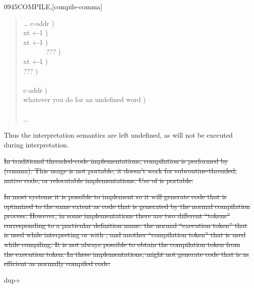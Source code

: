 \begin{worddef}{0945}{COMPILE,}[compile-comma]
\begin{rationale}
		\begin{quote}\ttfamily
		\ldots 										\tab[22]	 c-addr ) \\
		  			\tab[17.2]	 xt +-1 ) \\
		\tab {}  		\tab[17.4]	 xt +-1 ) \\
			\tab[2]   \ 
				 \ 
			 \ 
				 \ 
											\tab[0.2]	 ??? ) \\
		\tab {}							\tab[21]	 xt +-1 ) \\
			\tab[2]   		\tab[14.6]	 ??? ) \\
		\tab {} \\
			\word{ELSE} 							\tab[22]	 c-addr ) \\
		\tab \word{p} \textrm{whatever you do for an undefined word} ) \\
		\word{THEN} \\
		\ldots
		\end{quote}

		Thus the interpretation semantics are left undefined, as 
		will not be executed during interpretation.

\sout{%
		In traditional threaded-code implementations, compilation is
		performed by \word{,} (comma). This usage is not portable; it
		doesn't work for subroutine-threaded, native code, or
		relocatable implementations. Use of  is portable.
}

\sout{%
		In most systems it is possible to implement \word{COMPILE,} so
		it will generate code that is optimized to the same extent as
		code that is generated by the normal compilation process.
		However, in some implementations there are two different
		``tokens'' corresponding to a particular definition name:
		the normal ``execution token'' that is used while interpreting
		or with \word{EXECUTE}, and another ``compilation token'' that
		is used while compiling. It is not always possible to obtain
		the compilation token from the execution token. In these
		implementations, \word{COMPILE,} might not generate code that
		is as efficient as normally compiled code.
}
\cbend
	\end{rationale}

	\begin{testing}\ttfamily
		  \word{+} \word{;}  dup+ \\
		 \\
		 \\
		\test{123 as}{246}
	\end{testing}
\end{worddef}


